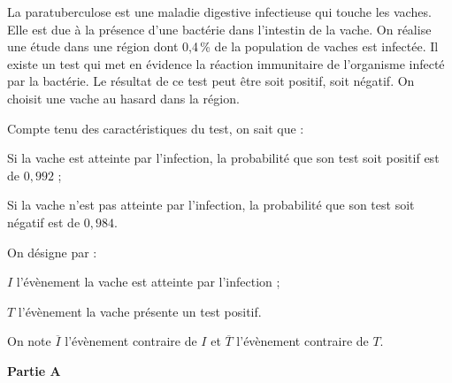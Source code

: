 \medskip

La paratuberculose est une maladie digestive infectieuse qui touche les vaches. Elle est due à la présence d'une bactérie dans l'intestin de la vache.
On réalise une étude dans une région dont 0,4\,\% de la population de vaches est infectée.
Il existe un test qui met en évidence la réaction immunitaire de l'organisme infecté par la bactérie.
Le résultat de ce test peut être soit \og positif\fg{}, soit \og négatif\fg{}.
On choisit une vache au hasard dans la région.

\begin{list}{\textbullet}{Compte tenu des caractéristiques du test, on sait que :}
\item Si la vache est atteinte par l'infection, la probabilité que son test soit positif est de $0,992$ ;
\item Si la vache n'est pas atteinte par l'infection, la probabilité que son test soit négatif est de $0,984$.
\end{list}

\begin{list}{\textbullet}{On désigne par :}
		\item $I$ l'évènement \og{}la vache est atteinte par l'infection\fg{} ;
		\item $T$ l'évènement \og{}la vache présente un test positif\fg{}.
	\end{list}

On note $\overline{I}$ l'évènement contraire de $I$ et $\overline{T}$ l'évènement contraire de $T$.





\bigskip

\textbf{Partie A}


